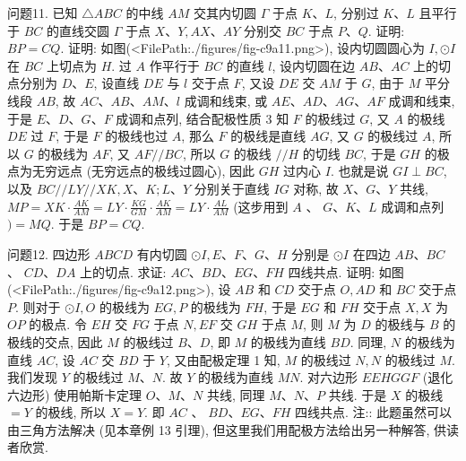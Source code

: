 问题11. 已知 $\triangle A B C$ 的中线 $A M$ 交其内切圆 $\Gamma$ 于点 $K 、 L$, 分别过 $K 、 L$ 且平行于 $B C$ 的直线交圆 $\Gamma$ 于点 $X 、 Y, A X 、 A Y$ 分别交 $B C$ 于点 $P 、 Q$. 证明: $B P=C Q$.
证明: 如图(<FilePath:./figures/fig-c9a11.png>), 设内切圆圆心为 $I, \odot I$ 在 $B C$ 上切点为 $H$. 过 $A$ 作平行于 $B C$ 的直线 $l$, 设内切圆在边 $A B 、 A C$ 上的切点分别为 $D 、 E$, 设直线 $D E$ 与 $l$ 交于点 $F$, 又设 $D E$ 交 $A M$ 于 $G$, 由于 $M$ 平分线段 $A B$, 故 $A C 、 A B 、 A M 、 l$ 成调和线束, 或 $A E 、 A D 、 A G 、 A F$ 成调和线束, 于是 $E 、 D 、 G 、 F$ 成调和点列, 结合配极性质 3 知 $F$ 的极线过 $G$, 又 $A$ 的极线 $D E$ 过 $F$, 于是 $F$ 的极线也过 $A$, 那么 $F$ 的极线是直线 $A G$, 又 $G$ 的极线过 $A$, 所以 $G$ 的极线为 $A F$, 又 $A F / / B C$, 所以 $G$ 的极线 $/ / H$ 的切线 $B C$, 于是 $G H$ 的极点为无穷远点 (无穷远点的极线过圆心), 因此 $G H$ 过内心 $I$. 也就是说 $G I \perp B C$, 以及 $B C / / L Y / / X K, X 、 K ; L 、 Y$ 分别关于直线 $I G$ 对称, 故 $X 、 G 、 Y$ 共线, $M P=X K \cdot \frac{A K}{A M}=L Y \cdot \frac{K G}{G M} \cdot \frac{A K}{A M}=L Y \cdot \frac{A L}{A M}$ (这步用到 $A$ 、 $G 、 K 、 L$ 成调和点列 $)=M Q$. 于是 $B P=C Q$.



问题12. 四边形 $A B C D$ 有内切圆 $\odot I, E 、 F 、 G 、 H$ 分别是 $\odot I$ 在四边 $A B 、 B C$ 、 $C D 、 D A$ 上的切点.
求证: $A C 、 B D 、 E G 、 F H$ 四线共点.
证明: 如图(<FilePath:./figures/fig-c9a12.png>), 设 $A B$ 和 $C D$ 交于点 $O, A D$ 和 $B C$ 交于点 $P$. 则对于 $\odot I, O$ 的极线为 $E G, P$ 的极线为 $F H$, 于是 $E G$ 和 $F H$ 交于点 $X, X$ 为 $O P$ 的极点.
令 $E H$ 交 $F G$ 于点 $N, E F$ 交 $G H$ 于点 $M$, 则 $M$ 为 $D$ 的极线与 $B$ 的极线的交点, 因此 $M$ 的极线过 $B 、 D$, 即 $M$ 的极线为直线 $B D$. 同理, $N$ 的极线为直线 $A C$, 设 $A C$ 交 $B D$ 于 $Y$, 又由配极定理 1 知, $M$ 的极线过 $N, N$ 的极线过 $M$. 我们发现 $Y$ 的极线过 $M 、 N$. 故 $Y$ 的极线为直线 $M N$. 对六边形 $E E H G G F$ (退化六边形) 使用帕斯卡定理 $O 、 M 、 N$ 共线, 同理 $M 、 N 、 P$ 共线.
于是 $X$ 的极线 $=Y$ 的极线, 所以 $X=Y$. 即 $A C$ 、 $B D 、 E G 、 F H$ 四线共点.
注:: 此题虽然可以由三角方法解决 (见本章例 13 引理), 但这里我们用配极方法给出另一种解答, 供读者欣赏.


